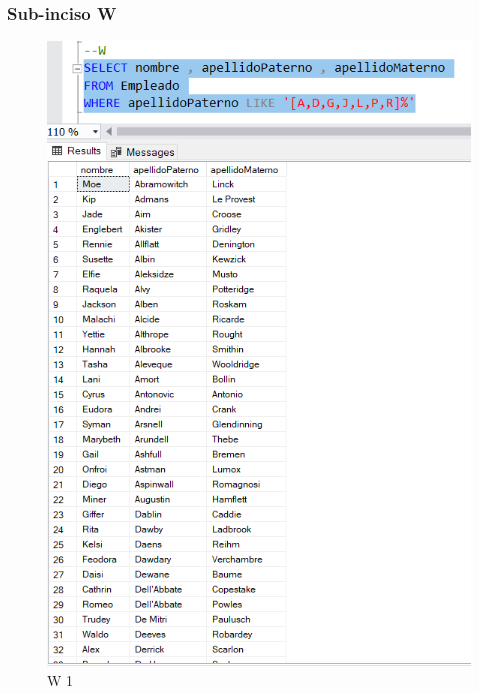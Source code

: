 \documentclass[a4paper, 12pt]{report}
\begin{document}
\subsubsection*{Sub-inciso W}
    \begin{figure}
        \includegraphics[width=\textwidth]
            {img/W1.png}\hfill
    \caption{W 1}
    \end{figure}
\end{document}

